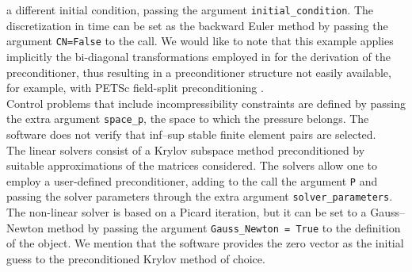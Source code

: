 \documentclass[letterpaper,10pt,english]{sphinxmanual}
\begin{document}
	a different initial condition, passing the argument
	\texttt{initial\_condition}. The discretization in time
	can be set as the backward Euler method by passing the argument
	\texttt{CN=False} to the call. We would like to note that this example
	applies implicitly the bi-diagonal transformations employed in
	\cite{Leveque_Pearson_2021} for the derivation of the preconditioner,
	thus resulting in a preconditioner structure not easily available, for
	example, with PETSc field-split preconditioning
	\cite{Brown_Knepley_May_McInnes_Smith}.\\
Control problems that include incompressibility constraints are defined
	by passing the extra argument \texttt{space\_p}, the space to which
	the pressure belongs. The software does not verify that inf--sup stable finite
	element pairs are selected.\\
The linear solvers consist of a Krylov subspace method preconditioned by suitable
	approximations of the matrices considered. The solvers allow one to
	employ a user-defined preconditioner, adding to the call the argument
	\texttt{P} and passing the solver parameters through the extra argument
	\texttt{solver\_parameters}. The non-linear solver is based on a Picard
	iteration, but it can be set to a Gauss--Newton method by passing the
	argument \texttt{Gauss\_Newton = True} to the definition of the object.
	We mention that the software provides the zero vector as the
	initial guess to the preconditioned Krylov method of choice.
\end{document}
